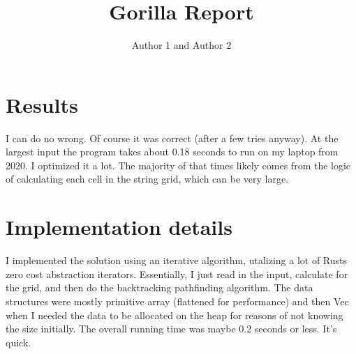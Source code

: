 \documentclass{article}
\title{Gorilla Report}
\author{Author 1 and Author 2}
\begin{document}
  \maketitle

  \section{Results}


  I can do no wrong. Of course it was correct (after a few tries anyway). At the largest input the program
  takes about 0.18 seconds to run on my laptop from 2020. I optimized it a lot.
  The majority of that times likely comes from the logic of calculating each cell in the string grid, which can be very large.

  \section{Implementation details}


  I implemented the solution using an iterative algorithm, utalizing a lot of Rusts zero cost abstraction iterators.
  Essentially, I just read in the input, calculate for the grid, and then do the backtracking pathfinding algorithm.
  The data structures were mostly primitive array (flattened for performance) and then Vec when I needed the data to be
  allocated on the heap for reasons of not knowing the size initially.
  The overall running time was maybe 0.2 seconds or less. It's quick.
\end{document}
